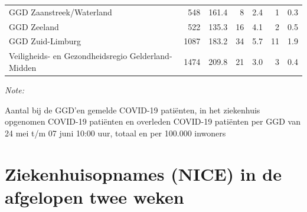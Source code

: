 \documentclass[
  english,
  man,floatsintext]{apa6}
\begin{document}
\begin{table}
\begin{threeparttable}
\begin{tabular}{lrrrrrr}
GGD Zaanstreek/Waterland & 548 & 161.4 & 8 & 2.4 & 1 & 0.3\\
GGD Zeeland & 522 & 135.3 & 16 & 4.1 & 2 & 0.5\\
GGD Zuid-Limburg & 1087 & 183.2 & 34 & 5.7 & 11 & 1.9\\
Veiligheids- en Gezondheidsregio Gelderland-Midden & 1474 & 209.8 & 21 & 3.0 & 3 & 0.4\\
\bottomrule
\end{tabular}
\begin{tablenotes}
\item \textit{Note: } 
\item Aantal bij de GGD’en gemelde COVID-19 patiënten, in het ziekenhuis opgenomen COVID-19 patiënten en overleden COVID-19 patiënten per GGD van 24 mei t/m 07 juni 10:00 uur, totaal en per 100.000 inwoners
\end{tablenotes}
\end{threeparttable}
\endgroup{}
\end{table}

\newpage

\hypertarget{ziekenhuisopnames-nice-in-de-afgelopen-twee-weken}{%
\section{Ziekenhuisopnames (NICE) in de afgelopen twee weken}\label{ziekenhuisopnames-nice-in-de-afgelopen-twee-weken}}
\end{document}
